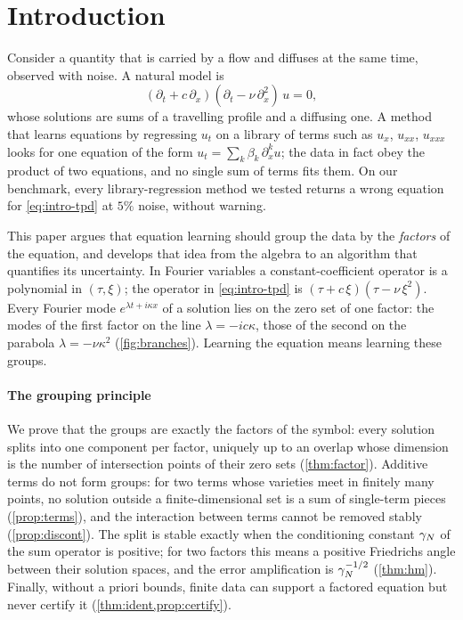 \section{Introduction}\label{sec:intro}
Consider a quantity that is carried by a flow and diffuses at the same time, observed with noise. A natural model is
\begin{equation}\label{eq:intro-tpd}
  (\partial_t+c\,\partial_x)(\partial_t-\nu\,\partial_x^2)\,u=0,
\end{equation}
whose solutions are sums of a travelling profile and a diffusing one. A method that learns equations by regressing
$u_t$ on a library of terms such as $u_x$, $u_{xx}$, $u_{xxx}$ looks for one equation of the form $u_t=\sum_k\beta_k\,\partial_x^ku$; the
data in fact obey the product of two equations, and no single sum of terms fits them. On our benchmark, every
library-regression method we tested returns a wrong equation for \eqref{eq:intro-tpd} at $5\%$ noise, without warning.

This paper argues that equation learning should group the data by the \emph{factors} of the equation, and develops that
idea from the algebra to an algorithm that quantifies its uncertainty. In Fourier variables a constant-coefficient operator
is a polynomial in $(\tau,\xi)$; the operator in \eqref{eq:intro-tpd} is $(\tau+c\,\xi)(\tau-\nu\,\xi^2)$. Every Fourier mode
$e^{\lambda t+i\kappa x}$ of a solution lies on the zero set of one factor: the modes of the first factor on the line
$\lambda=-ic\kappa$, those of the second on the parabola $\lambda=-\nu\kappa^2$ (\cref{fig:branches}). Learning the equation
means learning these groups.



\paragraph{The grouping principle} We prove that the groups are exactly the factors of the symbol: every solution splits
into one component per factor, uniquely up to an overlap whose dimension is the number of intersection points of their
zero sets (\cref{thm:factor}). Additive terms do not form groups: for two terms whose varieties meet in finitely many points, no solution outside a
finite-dimensional set is a sum of single-term pieces (\cref{prop:terms}), and the interaction between terms cannot be
removed stably (\cref{prop:discont}). The split is stable exactly when the conditioning constant $\gamma_{N}$ of the sum operator
is positive; for two factors this means a positive Friedrichs angle between their solution spaces, and the error
amplification is $\gamma_{N}^{-1/2}$ (\cref{thm:hm}). Finally, without a priori bounds, finite data can support a factored
equation but never certify it (\cref{thm:ident,prop:certify}).

